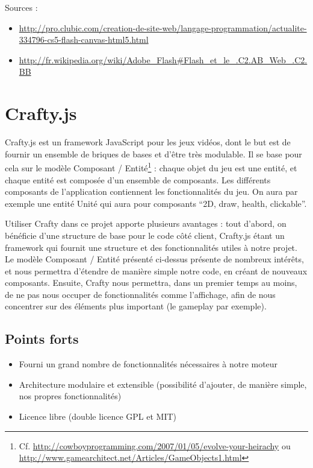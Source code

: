 \documentclass[a4paper,10pt]{report}
\begin{document}
Sources : 

\begin{itemize}
  \item \url{http://pro.clubic.com/creation-de-site-web/langage-programmation/actualite-334796-cs5-flash-canvas-html5.html}
  \item \url{http://fr.wikipedia.org/wiki/Adobe_Flash#Flash_et_le_.C2.AB_Web_.C2.BB}
\end{itemize}

\section{Crafty.js}

Crafty.js est un framework JavaScript pour les jeux vidéos, dont le but est de fournir un ensemble de briques de bases et d'être très modulable. Il se base pour cela sur le modèle Composant / Entité\footnote{Cf. \url{http://cowboyprogramming.com/2007/01/05/evolve-your-heirachy} ou \url{http://www.gamearchitect.net/Articles/GameObjects1.html}} : chaque objet du jeu est une entité, et chaque entité est composée d'un ensemble de composants. Les différents composants de l'application contiennent les fonctionnalités du jeu. On aura par exemple une entité Unité qui aura pour composants ``2D, draw, health, clickable''. 

Utiliser Crafty dans ce projet apporte plusieurs avantages : tout d'abord, on bénéficie d'une structure de base pour le code côté client, Crafty.js étant un framework qui fournit une structure et des fonctionnalités utiles à notre projet. Le modèle Composant / Entité présenté ci-dessus présente de nombreux intérêts, et nous permettra d'étendre de manière simple notre code, en créant de nouveaux composants. Ensuite, Crafty nous permettra, dans un premier temps au moins, de ne pas nous occuper de fonctionnalités comme l'affichage, afin de nous concentrer sur des éléments plus important (le gameplay par exemple). 

\subsection{Points forts}

\begin{itemize}
  \item Fourni un grand nombre de fonctionnalités nécessaires à notre moteur
  \item Architecture modulaire et extensible (possibilité d'ajouter, de manière simple, nos propres fonctionnalités)
  \item Licence libre (double licence GPL et MIT)
\end{itemize}
\end{document}
